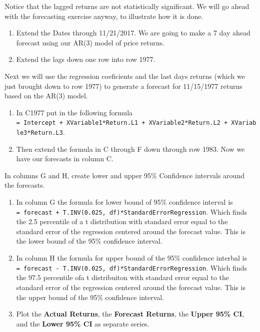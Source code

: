\documentclass[
  letterpaper,
  DIV=11,
  numbers=noendperiod]{scrreprt}
\begin{document}
Notice that the lagged returns are not statistically significant. We
will go ahead with the forecasting exercise anyway, to illustrate how it
is done.

\begin{enumerate}
\def\labelenumi{\arabic{enumi}.}
\setcounter{enumi}{5}
\item
  Extend the Dates through 11/21/2017. We are going to make a 7 day
  ahead forecast using our AR(3) model of price returns.
\item
  Extend the lags down one row into row 1977.
\end{enumerate}

Next we will use the regression coeficients and the last days returns
(which we just brought down to row 1977) to generate a forecast for
11/15/1977 returns based on the AR(3) model.

\begin{enumerate}
\def\labelenumi{\arabic{enumi}.}
\setcounter{enumi}{7}
\item
  In C1977 put in the following formula
  \texttt{=\ Intercept\ +\ XVariable1*Return.L1\ +\ XVariable2*Return.L2\ +\ XVariable3*Return.L3}.
\item
  Then extend the formula in C through F down through row 1983. Now we
  have our forecasts in column C.
\end{enumerate}

In columns G and H, create lower and upper 95\% Confidence intervals
around the forecasts.

\begin{enumerate}
\def\labelenumi{\arabic{enumi}.}
\setcounter{enumi}{9}
\item
  In column G the formula for lower bound of 95\% confidence interval is
  \texttt{=\ forecast\ +\ T.INV(0.025,\ df)*StandardErrorRegression}.
  Which finds the 2.5 percentile of a t distribution with standard error
  equal to the standard error of the regression centered around the
  forecast value. This is the lower bound of the 95\% confidence
  interval.
\item
  In column H the formula for upper bound of the 95\% confidence
  interbal is
  \texttt{=\ forecast\ -\ T.INV(0.025,\ df)*StandardErrorRegression}.
  Which finds the 97.5 percentile ofa t distribuiton with standard error
  equal to the standard error of the regression centered around the
  forecast value. This is the upper bound of the 95\% confidence
  interval.
\item
  Plot the \textbf{Actual Returns}, the \textbf{Forecast Returns}, the
  \textbf{Upper 95\% CI}, and the \textbf{Lower 95\% CI} as separate
  series.
\end{enumerate}
\end{document}
